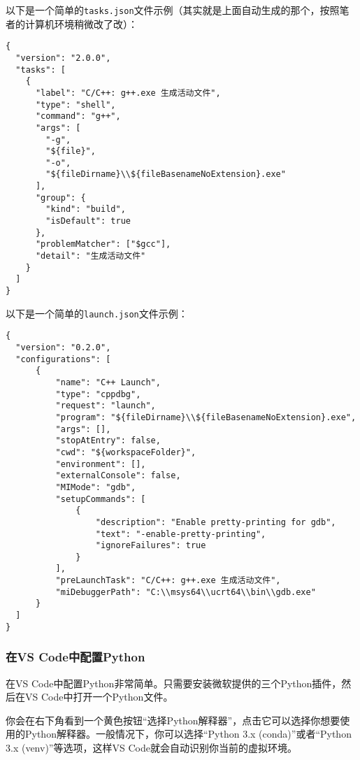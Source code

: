 \documentclass[../main.tex]{subfiles}
\begin{document}
以下是一个简单的\texttt{tasks.json}文件示例（其实就是上面自动生成的那个，按照笔者的计算机环境稍微改了改）：

\begin{lstlisting}
{
  "version": "2.0.0",
  "tasks": [
    {
      "label": "C/C++: g++.exe 生成活动文件",
      "type": "shell",
      "command": "g++",
      "args": [
        "-g",
        "${file}",
        "-o",
        "${fileDirname}\\${fileBasenameNoExtension}.exe"
      ],
      "group": {
        "kind": "build",
        "isDefault": true
      },
      "problemMatcher": ["$gcc"],
      "detail": "生成活动文件"
    }
  ]
}
\end{lstlisting}

以下是一个简单的\texttt{launch.json}文件示例：

\begin{lstlisting}
{
  "version": "0.2.0",
  "configurations": [
      {
          "name": "C++ Launch",
          "type": "cppdbg",
          "request": "launch",
          "program": "${fileDirname}\\${fileBasenameNoExtension}.exe",
          "args": [],
          "stopAtEntry": false,
          "cwd": "${workspaceFolder}",
          "environment": [],
          "externalConsole": false,
          "MIMode": "gdb",
          "setupCommands": [
              {
                  "description": "Enable pretty-printing for gdb",
                  "text": "-enable-pretty-printing",
                  "ignoreFailures": true
              }
          ],
          "preLaunchTask": "C/C++: g++.exe 生成活动文件",
          "miDebuggerPath": "C:\\msys64\\ucrt64\\bin\\gdb.exe"
      }
  ]
}
\end{lstlisting}

\subsubsection{在VS Code中配置Python}

在VS Code中配置Python非常简单。只需要安装微软提供的三个Python插件，然后在VS Code中打开一个Python文件。

你会在右下角看到一个黄色按钮“选择Python解释器”，点击它可以选择你想要使用的Python解释器。一般情况下，你可以选择“Python 3.x (conda)”或者“Python 3.x (venv)”等选项，这样VS Code就会自动识别你当前的虚拟环境。
\end{document}
